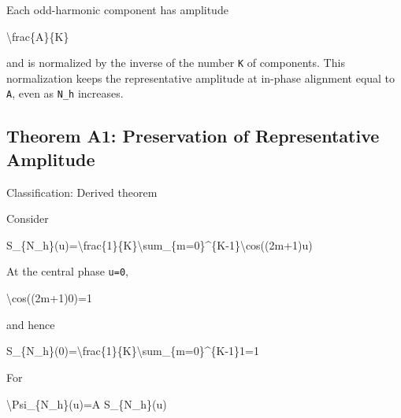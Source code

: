 \documentclass[
  a4paper]{article}
\newenvironment{Shaded}{}{}
\newcommand{\NormalTok}[1]{#1}
\begin{document}
Each odd-harmonic component has amplitude

\begin{Shaded}
\begin{Highlighting}[]
\NormalTok{\textbackslash{}frac\{A\}\{K\}}
\end{Highlighting}
\end{Shaded}

and is normalized by the inverse of the number \texttt{K} of components.
This normalization keeps the representative amplitude at in-phase
alignment equal to \texttt{A}, even as \texttt{N\_h} increases.

\subsection{Theorem A1: Preservation of Representative
Amplitude}\label{theorem-a1-preservation-of-representative-amplitude}

Classification: Derived theorem

Consider

\begin{Shaded}
\begin{Highlighting}[]
\NormalTok{S\_\{N\_h\}(u)=\textbackslash{}frac\{1\}\{K\}\textbackslash{}sum\_\{m=0\}\^{}\{K{-}1\}\textbackslash{}cos((2m+1)u)}
\end{Highlighting}
\end{Shaded}

At the central phase \texttt{u=0},

\begin{Shaded}
\begin{Highlighting}[]
\NormalTok{\textbackslash{}cos((2m+1)0)=1}
\end{Highlighting}
\end{Shaded}

and hence

\begin{Shaded}
\begin{Highlighting}[]
\NormalTok{S\_\{N\_h\}(0)=\textbackslash{}frac\{1\}\{K\}\textbackslash{}sum\_\{m=0\}\^{}\{K{-}1\}1=1}
\end{Highlighting}
\end{Shaded}

For

\begin{Shaded}
\begin{Highlighting}[]
\NormalTok{\textbackslash{}Psi\_\{N\_h\}(u)=A S\_\{N\_h\}(u)}
\end{Highlighting}
\end{Shaded}
\end{document}
